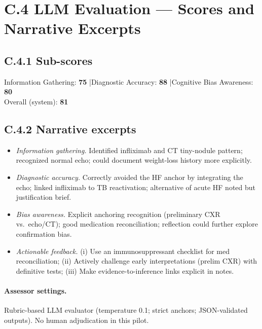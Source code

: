 \section*{C.4 \quad LLM Evaluation — Scores and Narrative Excerpts}
\label{app:session_s6:llm}

\subsection*{C.4.1 \quad Sub-scores}
\noindent
Information Gathering: \textbf{75} \quad|\quad Diagnostic Accuracy: \textbf{88} \quad|\quad Cognitive Bias Awareness: \textbf{80} \\
Overall (system): \textbf{81}

\subsection*{C.4.2 \quad Narrative excerpts}
\begin{itemize}
  \item \emph{Information gathering.} Identified infliximab and CT tiny-nodule pattern; recognized normal echo; could document weight-loss history more explicitly.
  \item \emph{Diagnostic accuracy.} Correctly avoided the HF anchor by integrating the echo; linked infliximab to TB reactivation; alternative of acute HF noted but justification brief.
  \item \emph{Bias awareness.} Explicit anchoring recognition (preliminary CXR vs.\ echo/CT); good medication reconciliation; reflection could further explore confirmation bias.
  \item \emph{Actionable feedback.} (i) Use an immunosuppressant checklist for med reconciliation; (ii) Actively challenge early interpretations (prelim CXR) with definitive tests; (iii) Make evidence-to-inference links explicit in notes.
\end{itemize}

\paragraph{Assessor settings.} Rubric-based LLM evaluator (temperature 0.1; strict anchors; JSON-validated outputs). No human adjudication in this pilot.

